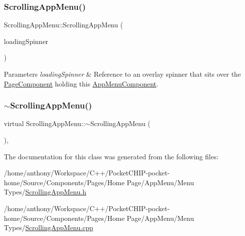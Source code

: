\subsubsection{\texorpdfstring{Scrolling\+App\+Menu()}{ScrollingAppMenu()}}
{\footnotesize\ttfamily Scrolling\+App\+Menu\+::\+Scrolling\+App\+Menu (\begin{DoxyParamCaption}\item[{\mbox{\hyperlink{classOverlaySpinner}{Overlay\+Spinner}} \&}]{loading\+Spinner }\end{DoxyParamCaption})}


\begin{DoxyParams}{Parameters}
{\em loading\+Spinner} & Reference to an overlay spinner that sits over the \mbox{\hyperlink{classPageComponent}{Page\+Component}} holding this \mbox{\hyperlink{classAppMenuComponent}{App\+Menu\+Component}}. \\
\hline
\end{DoxyParams}
\mbox{\label{classScrollingAppMenu_a1c078885624aa4aba2f8d4f3ffb61876}} 
\subsubsection{\texorpdfstring{$\sim$\+Scrolling\+App\+Menu()}{~ScrollingAppMenu()}}
{\footnotesize\ttfamily virtual Scrolling\+App\+Menu\+::$\sim$\+Scrolling\+App\+Menu (\begin{DoxyParamCaption}{ }\end{DoxyParamCaption})\hspace{0.3cm}{\ttfamily [inline]}, {\ttfamily [virtual]}}



The documentation for this class was generated from the following files\+:\begin{DoxyCompactItemize}
\item 
/home/anthony/\+Workspace/\+C++/\+Pocket\+C\+H\+I\+P-\/pocket-\/home/\+Source/\+Components/\+Pages/\+Home Page/\+App\+Menu/\+Menu Types/\mbox{\hyperlink{ScrollingAppMenu_8h}{Scrolling\+App\+Menu.\+h}}\item 
/home/anthony/\+Workspace/\+C++/\+Pocket\+C\+H\+I\+P-\/pocket-\/home/\+Source/\+Components/\+Pages/\+Home Page/\+App\+Menu/\+Menu Types/\mbox{\hyperlink{ScrollingAppMenu_8cpp}{Scrolling\+App\+Menu.\+cpp}}\end{DoxyCompactItemize}
